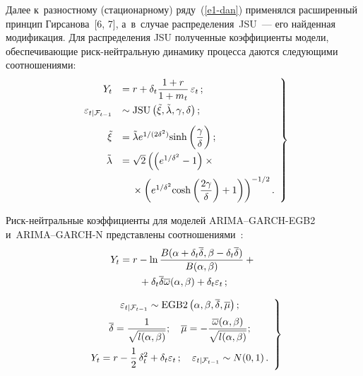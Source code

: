 \begin{multicols}{2}

  Далее к~разностному (стационарному) ряду~(\ref{e1-dan}) применялся 
расширенный принцип Гирсанова~[6, 7], а~в~случае распределения~JSU~---
 его найденная модификация. Для распределения JSU %
полученные коэффициенты модели, обес\-пе\-чи\-ва\-ющие риск-ней\-т\-раль\-ную 
динамику процесса даются сле\-ду\-ющи\-ми соотношениями:
  \begin{equation}
  \left.
  \begin{array}{rl}
  Y_t&=r+\delta_t\displaystyle\frac{\displaystyle 1+r\mathstrut}{\displaystyle 1+m_t\mathstrut}\,\varepsilon_t\,;\\[9pt]
   \varepsilon_{t\vert
  \mathcal{F}_{t-1}} &\sim \mathrm{JSU}\left( 
\tilde{\xi},\tilde{\lambda},\gamma,\delta\right);\\[9pt]
  \tilde{\xi}&=\tilde{\lambda}e^{1/(2\delta^2)}\mathrm{sinh}\left( \displaystyle\frac{\displaystyle \gamma\mathstrut}{\displaystyle \delta\mathstrut} \right);\\[9pt] 
\tilde{\lambda}&=\sqrt{2}\left( \left( e^{1/\delta^2}-1\right)\times{}\right.\\[9pt]
&\hspace*{3mm}\left.{}\times\left(
  e^{1/\delta^2}\mathrm{cosh}\left( \displaystyle\frac{\displaystyle 2\gamma\mathstrut}{\displaystyle \delta\mathstrut}\right)+1\right)\right)^{-1/2}.
  \end{array}
  \right\}
  \label{e3-dan}
  \end{equation}
  
  Риск-нейтральные коэффициенты для моделей ARIMA--GARCH-EGB2  
и~ARIMA--GARCH-N представлены соотношениями~\cite{7-dan}:
  \begin{multline}
  Y_t=r-\ln\displaystyle\frac{\displaystyle B(\alpha+\delta_t\overline{\delta},\beta-
\delta_t\overline{\delta})\mathstrut}{\displaystyle B(\alpha,\beta)\mathstrut}+{}\\
{}+\delta_t\overline{\delta}\overline{\omega}(\alpha,\beta)+
  \delta_t\varepsilon_t\,;
  \label{e4-dan}
  \end{multline}
  
  \noindent
  \begin{equation}
  \left.
  \begin{array}{c}
  \varepsilon_{t\vert\mathcal{F}_{t-1}}\sim 
\mathrm{EGB2}\left(\alpha,\beta,\overline{\delta},\overline{\mu}\right);\\[6pt]
  \overline{\delta}=\displaystyle\frac{\displaystyle 1\mathstrut}{\displaystyle \sqrt{l(\alpha,\beta)}\mathstrut};\quad
   \overline{\mu}=-
\displaystyle\frac{\displaystyle \overline{\omega}(\alpha,\beta)\mathstrut}{\displaystyle \sqrt{l(\alpha,\beta)}\mathstrut};\\[12pt]
  Y_t=r-\displaystyle\frac{\displaystyle 1\mathstrut}{\displaystyle 2\mathstrut}\,\delta^2_t+\delta_t \varepsilon_t\,; \quad 
\varepsilon_{t\vert\mathcal{F}_{t-1}} \sim N(0,1)\,.
  \end{array}
  \right\}
  \label{e5-dan}
  \end{equation}
  

\end{multicols}
